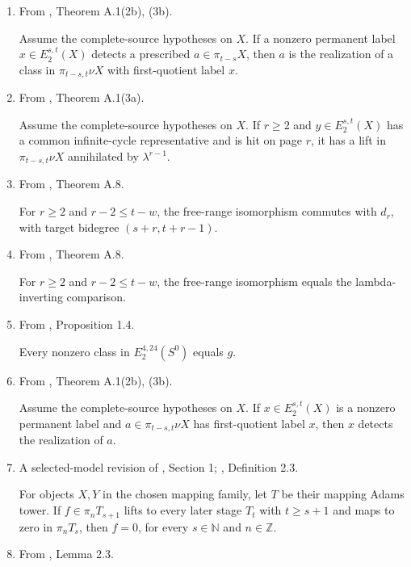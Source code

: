 \begin{theorem}
\begin{enumerate}
For any classical map $f:X\to Y$ of Adams tower filtration at least $k\in\mathbb N$, there is a map $\widetilde f:\nu X\to\Sigma^{0,-k}\nu Y$ with $\lambda^k\widetilde f=\nu f$.
\item From \cite{BHS}, Theorem A.1(2b), (3b).\par

Assume the complete-source hypotheses on $X$. If a nonzero permanent label $x\in E_2^{s,t}(X)$ detects a prescribed $a\in\pi_{t-s}X$, then $a$ is the realization of a class in $\pi_{t-s,t}\nu X$ with first-quotient label $x$.
\item From \cite{BHS}, Theorem A.1(3a).\par

Assume the complete-source hypotheses on $X$. If $r\ge2$ and $y\in E_2^{s,t}(X)$ has a common infinite-cycle representative and is hit on page $r$, it has a lift in $\pi_{t-s,t}\nu X$ annihilated by $\lambda^{r-1}$.
\item From \cite{BHS}, Theorem A.8.\par

For $r\ge2$ and $r-2\le t-w$, the free-range isomorphism commutes with $d_r$, with target bidegree $(s+r,t+r-1)$.
\item From \cite{BHS}, Theorem A.8.\par

For $r\ge2$ and $r-2\le t-w$, the free-range isomorphism equals the lambda-inverting comparison.
\item From \cite{BR21}, Proposition 1.4.\par

Every nonzero class in $E_2^{4,24}(S^0)$ equals $g$.
\item From \cite{BHS}, Theorem A.1(2b), (3b).\par

Assume the complete-source hypotheses on $X$. If $x\in E_2^{s,t}(X)$ is a nonzero permanent label and $a\in\pi_{t-s,t}\nu X$ has first-quotient label $x$, then $x$ detects the realization of $a$.
\item A selected-model revision of \cite{Moss}, Section 1; \cite{BelmontKong2024}, Definition 2.3.\par

For objects $X,Y$ in the chosen mapping family, let $T$ be their mapping Adams tower. If $f\in\pi_n T_{s+1}$ lifts to every later stage $T_t$ with $t\ge s+1$ and maps to zero in $\pi_n T_s$, then $f=0$, for every $s\in\mathbb N$ and $n\in\mathbb Z$.
\item From \cite{Adams58}, Lemma 2.3.\par


\end{enumerate}
\end{theorem}

